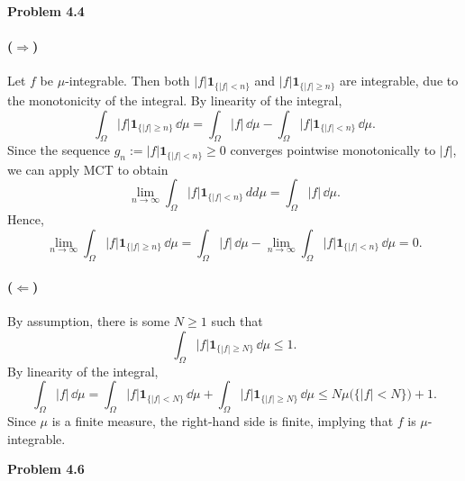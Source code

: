 \bigskip
\textbf{Problem 4.4}

\paragraph{($\Rightarrow$)} Let $f$ be $\mu$-integrable. Then both $|f|\mathbf{1}_{\{|f|<n\}}$ and $|f|\mathbf{1}_{\{|f|\ge n\}}$ are integrable, due to the monotonicity of the integral. By linearity of the integral,
\[
	\int_\Omega |f|\mathbf{1}_{\{|f|\ge n\}}\,\dd\mu = \int_\Omega |f|\,\dd\mu - \int_\Omega |f|\mathbf{1}_{\{|f|< n\}}\,\dd\mu.
\]
Since the sequence $g_n:= |f|\mathbf{1}_{\{|f|< n\}}\ge 0$ converges pointwise monotonically to $|f|$, we can apply MCT to obtain
\[
	\lim_{n\to\infty} \int_\Omega |f|\mathbf{1}_{\{|f|< n\}}\,dd\mu = \int_\Omega |f|\,\dd\mu.
\]
Hence,
\[	
	\lim_{n\to\infty}\int_\Omega |f|\mathbf{1}_{\{|f|\ge n\}}\,\dd\mu = \int_\Omega |f|\,\dd\mu - \lim_{n\to\infty}\int_\Omega |f|\mathbf{1}_{\{|f|< n\}}\,\dd\mu = 0.
\]

\paragraph{($\Leftarrow$)} By assumption, there is some $N\ge 1$ such that
\[
	\int_\Omega |f|\mathbf{1}_{\{|f|\ge N\}}\,\dd\mu \le 1.
\]
By linearity of the integral,
\[
	\int_\Omega |f|\,\dd\mu = \int_\Omega |f|\mathbf{1}_{\{|f|< N\}}\,\dd\mu +\int_\Omega |f|\mathbf{1}_{\{|f|\ge N\}}\,\dd\mu \le N \mu\bigl(\{|f|< N\}\bigr) + 1.
\]
Since $\mu$ is a finite measure, the right-hand side is finite, implying that $f$ is $\mu$-integrable.


\bigskip
\textbf{Problem 4.6}

